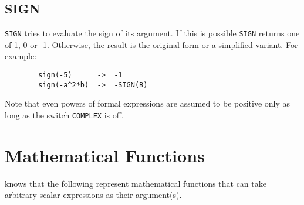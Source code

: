 \subsection{SIGN}
\hypertarget{operator:SIGN}{}
\texttt{SIGN} tries to evaluate the sign of its argument. If this
is possible \texttt{SIGN} returns one of 1, 0 or -1.  Otherwise, the result
is the original form or a simplified variant. For example:
\begin{verbatim}
        sign(-5)      ->  -1
        sign(-a^2*b)  ->  -SIGN(B)
\end{verbatim}
Note that even powers of formal expressions are assumed to be
positive only as long as the switch \texttt{COMPLEX} is off.

\section{Mathematical Functions}
\hypertarget{operator:ACOS}{}
\hypertarget{operator:ACOSH}{}
\hypertarget{operator:ACOT}{}
\hypertarget{operator:ACOTH}{}
\hypertarget{operator:ACSC}{}
\hypertarget{operator:ACSCH}{}
\hypertarget{operator:ASEC}{}
\hypertarget{operator:ASECH}{}
\hypertarget{operator:ASIN}{}
\hypertarget{operator:ASINH}{}
\hypertarget{operator:ATAN}{}
\hypertarget{operator:ATANH}{}
\hypertarget{operator:ATAN2}{}
\hypertarget{operator:COS}{}
\hypertarget{operator:COSH}{}
\hypertarget{operator:COT}{}
\hypertarget{operator:COTH}{}
\hypertarget{operator:CSC}{}
\hypertarget{operator:CSCH}{}
\hypertarget{operator:EXP}{}
\hypertarget{operator:HYPOT}{}
\hypertarget{operator:LOG}{}
\hypertarget{operator:LN}{}
\hypertarget{operator:LOGB}{}
\hypertarget{operator:LOG10}{}
\hypertarget{operator:SEC}{}
\hypertarget{operator:SECH}{}
\hypertarget{operator:SIN}{}
\hypertarget{operator:SINH}{}
\hypertarget{operator:SQRT}{}
\hypertarget{operator:TAN}{}
\hypertarget{operator:TANH}{}

{\REDUCE} knows that the following represent mathematical functions
 that can
take arbitrary scalar expressions as their argument(s).\\

